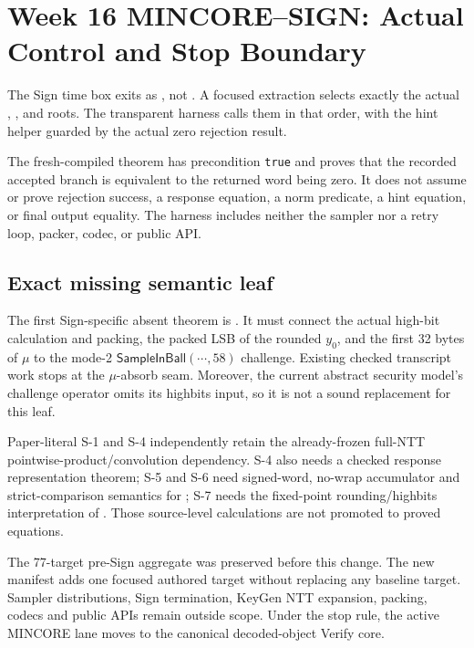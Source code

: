 \section{Week 16 MINCORE--SIGN: Actual Control and Stop Boundary}

The Sign time box exits as , not
. A focused extraction selects exactly the actual
, , and
 roots. The transparent
 harness calls them in that order, with
the hint helper guarded by the actual zero rejection result.

The fresh-compiled theorem
 has precondition
\texttt{true} and proves that the recorded accepted branch is equivalent to
the returned  word being zero. It does not assume or
prove rejection success, a response equation, a norm predicate, a hint
equation, or final output equality. The harness includes neither the sampler
nor a retry loop, packer, codec, or public API.

\subsection*{Exact missing semantic leaf}

The first Sign-specific absent theorem is
. It must
connect the actual high-bit calculation and packing, the packed LSB of the
rounded \(y_0\), and the first 32 bytes of \(\mu\) to the mode-2
\(\mathsf{SampleInBall}(\cdots,58)\) challenge. Existing checked transcript
work stops at the \(\mu\)-absorb seam. Moreover, the current abstract security
model's challenge operator omits its highbits input, so it is not a sound
replacement for this leaf.

Paper-literal S-1 and S-4 independently retain the already-frozen full-NTT
pointwise-product/convolution dependency. S-4 also needs a checked response
representation theorem; S-5 and S-6 need signed-word, no-wrap accumulator and
strict-comparison semantics for ; S-7 needs the
fixed-point rounding/highbits interpretation of .
Those source-level calculations are not promoted to proved equations.

The 77-target pre-Sign aggregate was preserved before this change. The new
manifest adds one focused authored target without replacing any baseline
target. Sampler distributions, Sign termination, KeyGen NTT expansion,
packing, codecs and public APIs remain outside scope. Under the stop rule, the
active MINCORE lane moves to the canonical decoded-object Verify core.
